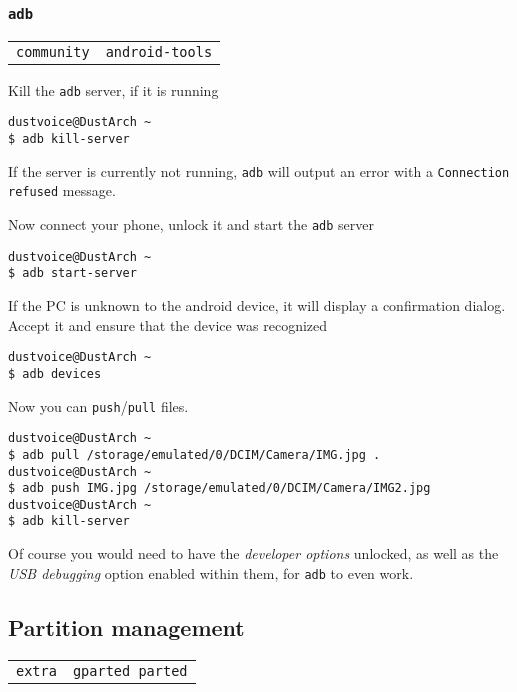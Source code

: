 \documentclass[9pt]{report}
\newenvironment{NOTE}
{\begin{tcolorbox}[colback=admonitionBG,coltitle=draculaFG,colframe=draculaBlue,colbacktitle=draculaBlue,title=NOTE]}
{\end{tcolorbox}}
\newenvironment{packagetable}
{\begin{longtabu}to \textwidth [b]{X[1,r]|X[1,l]}}
{\end{longtabu}}
\begin{document}
\newpage

\hypertarget{x-adb}{\subsubsection{\texttt{adb}}}
\begin{packagetable}
    \texttt{community} & \texttt{android-tools} \\ 
\end{packagetable}

Kill the \texttt{adb} server, if it is running


\begin{verbatim}
dustvoice@DustArch ~
$ adb kill-server
\end{verbatim}

\begin{NOTE}
    If the server is currently not running, \texttt{adb} will output an error with a \texttt{Connection refused} message.

\end{NOTE}
Now connect your phone, unlock it and start the \texttt{adb} server


\begin{verbatim}
dustvoice@DustArch ~
$ adb start-server
\end{verbatim}

If the PC is unknown to the android device, it will display a confirmation dialog.
Accept it and ensure that the device was recognized


\begin{verbatim}
dustvoice@DustArch ~
$ adb devices
\end{verbatim}

Now you can \texttt{push}/\texttt{pull} files.


\begin{verbatim}
dustvoice@DustArch ~
$ adb pull /storage/emulated/0/DCIM/Camera/IMG.jpg .
dustvoice@DustArch ~
$ adb push IMG.jpg /storage/emulated/0/DCIM/Camera/IMG2.jpg
dustvoice@DustArch ~
$ adb kill-server
\end{verbatim}

\begin{NOTE}
    Of course you would need to have the \emph{developer options} unlocked, as well as the \emph{USB debugging} option enabled within them, for \texttt{adb} to even work.

\end{NOTE}

\newpage

\hypertarget{x-partition-management}{\subsection{Partition management}}
\begin{packagetable}
    \texttt{extra} & \texttt{gparted parted} \\ 
\end{packagetable}
\end{document}
